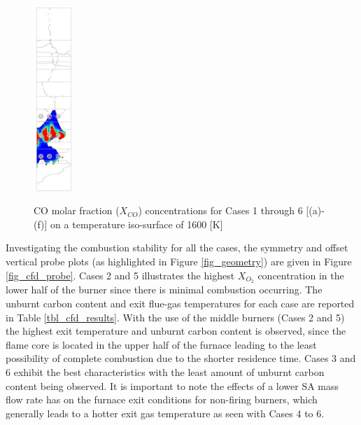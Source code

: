 \documentclass[twocolumn,10pt]{asme2ej}
\begin{document}
\begin{figure}[h!]
{				\includegraphics[height = 7cm]{FBRM05_ISO_COPPM_S}}
\caption{CO molar fraction ($X_{CO}$) concentrations for 
Cases 1 through 6 [(a)-(f)] on a temperature iso-surface of 1600 [K]}
\label{fig_cfd_coppm}
\end{figure}

Investigating the combustion stability for all the cases, the symmetry and offset vertical probe plots (as highlighted in Figure \ref{fig_geometry}) are given in Figure \ref{fig_cfd_probe}. Cases 2 and 5 illustrates the highest $X_{O_{2}}$ concentration in the lower half of the burner since there is minimal combustion occurring. The unburnt carbon content and exit flue-gas temperatures for each case are reported in Table \ref{tbl_cfd_results}. With the use of the middle burners (Cases 2 and 5) the highest exit temperature and unburnt carbon content is observed, since the flame core is located in the upper half of the furnace leading to the least possibility of complete combustion due to the shorter residence time. Cases 3 and 6 exhibit the best characteristics with the least amount of unburnt carbon content being observed. It is important to note the effects of a lower SA mass flow rate has on the furnace exit conditions for non-firing burners, which generally leads to a hotter exit gas temperature as seen with Cases 4 to 6. \\
\end{document}
